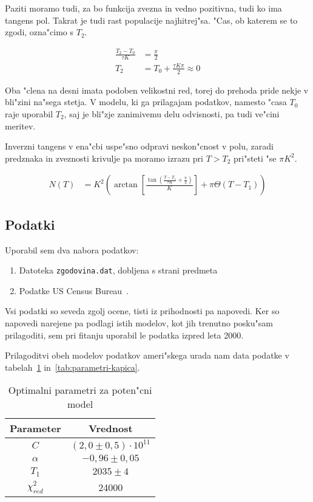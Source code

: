 \documentclass[a4paper,10pt]{article}
\begin{document}
Paziti moramo tudi, za bo funkcija zvezna in vedno pozitivna, tudi ko ima tangens pol. Takrat je tudi rast populacije najhitrej"sa. "Cas, ob katerem se to zgodi, ozna"cimo s $T_2$. 

\begin{align}
 \frac{T_2-T_0}{\tau K} &= \frac{\pi}{2} \\
 T_2 &= T_0 + \frac{\tau K \pi}{2} \approx 0
\end{align}

Oba "clena na desni imata podoben velikostni red, torej do prehoda pride nekje v bli"zini na"sega stetja. V modelu, ki ga prilagajam podatkov, namesto "casa $T_0$ raje uporabil $T_2$, saj je bli"zje zanimivemu delu odvisnosti, pa tudi ve"cini meritev. 

Inverzni tangens v ena"cbi uspe"sno odpravi neskon"cnost v polu, zaradi predznaka in zveznosti krivulje pa moramo izrazu pri $T>T_2$ pri"steti "se $\pi K^2$. 

\begin{align}
N(T) &= K^2 \left( \arctan\left[ \frac{\tan \left(\frac{T-T_1}{\tau K} + \frac{\pi}{2}\right)}{K}\right] + \pi \Theta(T-T_1) \right)
\end{align}

\subsection{Podatki}

Uporabil sem dva nabora podatkov:

\begin{enumerate}
 \item Datoteka \texttt{zgodovina.dat}, dobljena s strani predmeta
 \item Podatke US Census Bureau~\cite{census}. 
\end{enumerate}

Vsi podatki so seveda zgolj ocene, tisti iz prihodnosti pa napovedi. Ker so napovedi narejene pa podlagi istih modelov, kot jih trenutno posku"sam prilagoditi, sem pri fitanju uporabil le podatka izpred leta 2000. 





Prilagoditvi obeh modelov podatkov ameri"skega urada nam data podatke v tabelah~\ref{tab:parametri-potencni} in~\ref{tab:parametri-kapica}. 


\begin{table}[h]
 \centering
\begin{tabular}{|c|c|}
 \hline
Parameter & Vrednost  \\
\hline
$C$ & $(2,0 \pm 0,5) \cdot 10^{11}$ \\
$\alpha$ & $-0,96 \pm 0,05$ \\
$T_1$ & $2035 \pm 4$ \\
\hline
$\chi^2_{red}$ & 24000 \\
\hline
\end{tabular}
\caption{Optimalni parametri za poten"cni model}
\label{tab:parametri-potencni}
\end{table}
\end{document}
